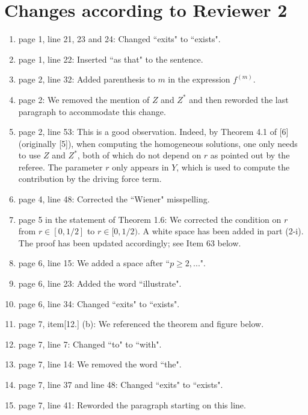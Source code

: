 \documentclass[12pt]{article}%
\theoremstyle{plain}
\theoremstyle{definition}
\numberwithin{equation}{section}
\begin{document}
\section{Changes according to Reviewer 2}
\begin{enumerate}
  \item[1.] page 1, line 21, 23 and 24: Changed ``exits" to ``exists".
  \item[2.] page 1, line 22: Inserted ``as that" to the sentence.
  \item[3.] page 2, line 32: Added parenthesis to $m$ in the expression
    $f^{(m)}$.
  \item[4.] page 2:  We removed the mention of $Z$ and $Z^*$ and then reworded
    the last paragraph to accommodate this change.
  \item[5.] page 2, line 53: This is a good observation. Indeed, by Theorem 4.1
    of [6] (originally [5]), when computing the homogeneous solutions, one only
    needs to use $Z$ and $Z^*$, both of which do not depend on $r$ as pointed
    out by the referee. The parameter $r$ only appears in $Y$, which is used to
    compute the contribution by the driving force term.
  \item[6.] page 4, line 48: Corrected the ``Wiener" misspelling.
  \item[7.] page 5 in the statement of Theorem 1.6: We corrected the condition
    on $r$ from $r\in[0,1/2]$ to $r\in[0,1/2)$. A white space has been added in
    part (2-i). The proof has been updated accordingly; see Item 63 below.
  \item[8.] page 6, line 15: We added a space after ``$p \ge 2,...$".
  \item[9.] page 6, line 23: Added the word ``illustrate".
  \item[10.] page 6, line 34: Changed ``exits" to ``exists".
  \item[11.] page 7, item[12.] (b): We referenced the theorem and figure below.
  \item[13.] page 7, line 7: Changed ``to" to ``with".
  \item[14.] page 7, line 14: We removed the word ``the".
  \item[15.] page 7, line 37 and line 48: Changed ``exits" to ``exists".
  \item[16.] page 7, line 41: Reworded the paragraph starting on this line.

\end{enumerate}
\end{document}
